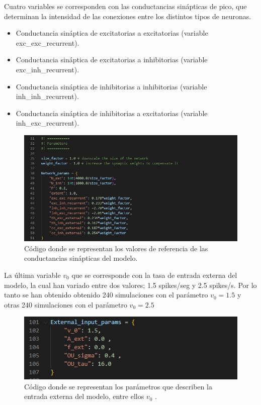 \documentclass[oneside,openright,titlepage,numbers=noenddot,openany,headinclude,footinclude=true,
cleardoublepage=empty,abstractoff,BCOR=5mm,paper=a4,fontsize=12pt,main=spanish]{scrreprt}
\begin{document}
Cuatro variables se corresponden con las conductancias sinápticas de pico, que determinan la intensidad de las conexiones entre los distintos tipos de neuronas.

\begin{itemize}
    \item Conductancia sináptica de excitatorias a excitatorias (variable exc\_exc\_recurrent).
    \item Conductancia sináptica de excitatorias a inhibitorias (variable exc\_inh\_recurrent).
    \item Conductancia sináptica de inhibitorias a inhibitorias (variable inh\_inh\_recurrent).
    \item Conductancia sináptica de inhibitorias a excitatorias (variable inh\_exc\_recurrent).
\end{itemize}

\begin{figure}[htb]
	\centering
	\includegraphics[width=16cm]{Código parámetros.png}
	\caption{Código donde se representan los valores de referencia de las conductancias sinápticas del modelo.}
\end{figure}

La última variable $v_{0}$ que se corresponde con la tasa de entrada externa del modelo, la cual han variado entre dos valores; 1.5 spikes/seg y 2.5 spikes/s. Por lo tanto se han obtenido obtenido 240 simulaciones con el parámetro $v_{0} = 1.5$ y otras 240 simulaciones con el parámetro $v_{0} = 2.5$

\begin{figure}[htb]
	\centering
	\includegraphics[width=12cm]{Código parámetro v_0.png}
	\caption{Código donde se representan los parámetros que describen la entrada externa del modelo, entre ellos  $v_{0}$ .}
\end{figure}
\end{document}
